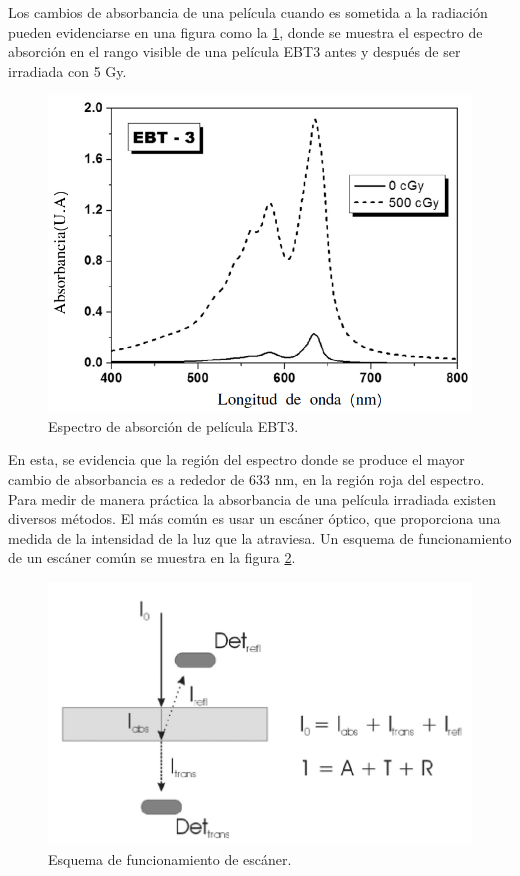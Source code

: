 Los cambios de absorbancia de una película cuando es sometida a la radiación pueden evidenciarse en una figura como la \ref{fig:AsorbanciaEBT3}, donde se muestra el espectro de absorción en el rango visible de una película EBT3 antes y después de ser irradiada con 5 Gy.\\
\begin{figure}[H]
	\centering
	\includegraphics[width=0.7\linewidth]{images/absorbancia.png}
	\caption{Espectro de absorción de película EBT3\cite{Devic2016}.}
	\label{fig:AsorbanciaEBT3}
\end{figure}

En esta, se evidencia que la región del espectro donde se produce el mayor cambio de absorbancia es a rededor de 633 nm, en la región roja del espectro.\\

Para medir de manera práctica la absorbancia de una película irradiada existen diversos métodos. El más común es usar un escáner óptico, que proporciona una medida de la intensidad de la luz que la atraviesa. Un esquema de funcionamiento de un escáner común se muestra en la figura \ref{fig:escaner}.\\ 
\begin{figure}[H]
	\centering
	\includegraphics[width=0.7\linewidth]{images/escaner.png}
	\caption{Esquema de funcionamiento de escáner\cite{Devic2016}.}
	\label{fig:escaner}
\end{figure}

